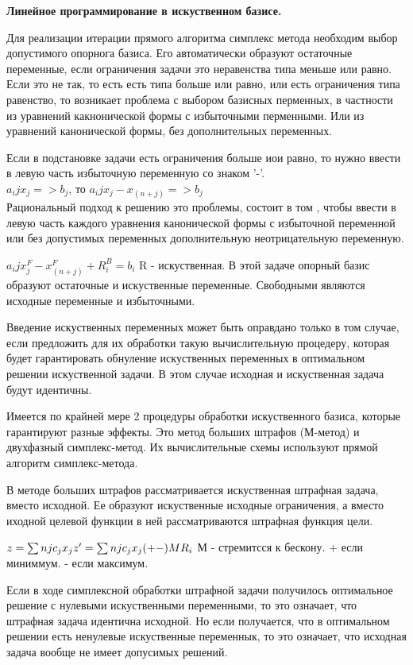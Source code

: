 \Large{ \textbf {Линейное программирование в искуственном базисе.}}

Для реализации итерации прямого алгоритма симплекс метода необходим выбор допустимого опорнога базиса.
Его автоматически образуют остаточные переменные, если ограничения задачи это неравенства типа меньше или равно.
Если это не так, то есть есть типа больше или равно, или есть ограничения типа равенство, то возникает проблема с выбором базисных перменных,
в частности из уравнений какнонической формы с избыточными перменными.
Или из уравнений канонической формы, без дополнительных переменных.

Если в подстановке задачи есть ограничения больше иои равно, то нужно ввести в левую часть избыточную переменную со знаком '-'.\\
$ a_ij x_j => b_j $, то $ a_ij x_j - x_(n+j )=> b_j $ \\

Рациональный подход к решению это проблемы, состоит в том ,
чтобы ввести в левую часть каждого уравнения канонической формы с избыточной переменной или без допустимых переменных
дополнительную неотрицательную переменную.

$ a_ij x_j^F - x_(n+j )^F + R_i^B = b_i $
R - искуственная.
В этой задаче опорный базис образуют остаточные и искуственные переменные. Свободными являются исходные переменные и избыточными.

Введение искуственных переменных может быть оправдано только в том случае,
если предложить для их обработки такую вычислительную процедеру,
которая будет гарантировать обнуление искуственных переменных в оптимальном решении искуственной задачи.
В этом случае исходная и искуственная задача будут идентичны.

Имеется по крайней мере 2 процедуры обработки искуственного базиса, которые гарантируют разные эффекты.
Это метод больших штрафов (М-метод) и двухфазный симплекс-метод.
Их вычислительные схемы используют прямой алгоритм симплекс-метода.

В методе больших штрафов рассматривается искуственная штрафная задача, вместо исходной.
Ее образуют искуственные исходные ограничения, а вместо иходной целевой функции в ней рассматриваются штрафная функция цели.

$z = \sum{n}{j} c_j x_j \\
z' = \sum{n}{j} c_j x_j (+-) MR_i \\
$
М - стремитсся к бескону.
+ если миниммум.
- если максимум.

Если в ходе симплексной обработки штрафной задачи получилось оптимальное решение с нулевыми искуственными переменными,
то это означает, что штрафная задача идентична исходной.
Но если получается, что в оптимальном решении есть ненулевые искуственные переменнык,
то это означает, что исходная задача вообще не имеет допусимых решений.

